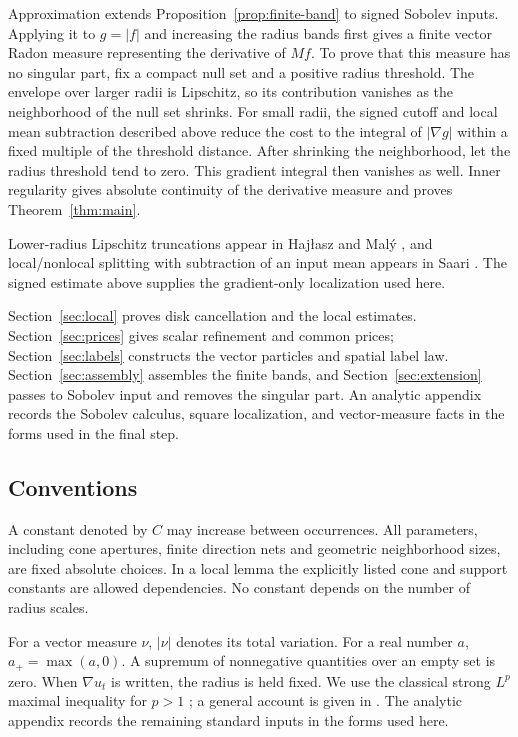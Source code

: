 Approximation extends Proposition~\ref{prop:finite-band} to signed Sobolev
inputs. Applying it to $g=|f|$ and increasing the radius bands first
gives a finite vector Radon measure representing the derivative
of $Mf$. To prove that this measure has no singular part, fix a
compact null set and a positive radius threshold. The envelope
over larger radii is Lipschitz, so its contribution vanishes
as the neighborhood of the null set shrinks. For small radii, the signed
cutoff and local mean subtraction described above reduce the cost
to the integral of $|\nabla g|$ within a fixed multiple of the
threshold distance. After shrinking the neighborhood, let the
radius threshold tend to zero. This gradient integral then
vanishes as well. Inner regularity gives absolute continuity
of the derivative measure and proves Theorem~\ref{thm:main}.

Lower-radius Lipschitz truncations appear in Haj{\l}asz and
Mal\'y \cite[Lemma~8]{HajlaszMaly2010}, and local/nonlocal
splitting with subtraction of an input mean appears in Saari
\cite[Section~3.1]{Saari2019}. The signed estimate above supplies
the gradient-only localization used here.

Section~\ref{sec:local} proves disk cancellation and the local estimates.
Section~\ref{sec:prices} gives scalar refinement and common prices; Section~\ref{sec:labels}
constructs the vector particles and spatial label law.
Section~\ref{sec:assembly} assembles the finite bands, and Section~\ref{sec:extension} passes to
Sobolev input and removes the singular part. An analytic appendix records the Sobolev
calculus, square localization, and vector-measure facts in the
forms used in the final step. \subsection{Conventions}


A constant denoted by $C$ may increase between occurrences.
All parameters, including cone apertures, finite direction nets and
geometric neighborhood sizes, are fixed absolute choices. In a local
lemma the explicitly listed cone and support constants are allowed
dependencies. No constant depends on the number of radius scales.

For a vector measure $\nu$, $|\nu|$ denotes its total variation.
For a real number $a$, $a_+=\max(a,0)$.
A supremum of nonnegative quantities over an empty set is zero.
When $\nabla u_t$ is written, the radius is held fixed.
We use the classical strong $L^p$ maximal inequality for $p>1$
\cite[(1.2)]{Kinnunen1997}; a general account is given in
\cite[Chapter~I]{Stein1970}. The analytic appendix records the
remaining standard inputs in the forms used here.
